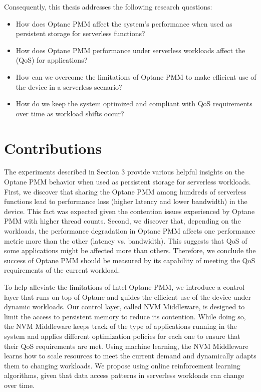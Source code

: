 Consequently, this thesis addresses the following research questions:

\begin{itemize}
    \item How does Optane PMM affect the system’s performance when used as persistent storage for serverless functions?
    \item How does Optane PMM performance under serverless workloads affect the (QoS) for applications?
    \item How can we overcome the limitations of Optane PMM to make efficient use of the device in a serverless scenario?
    \item How do we keep the system optimized and compliant with QoS requirements over time as workload shifts occur?
\end{itemize}

\section{Contributions}

The experiments described in Section 3 provide various helpful insights on the Optane PMM behavior when used as persistent storage for serverless workloads. First, we discover that sharing the Optane PMM among hundreds of serverless functions lead to performance loss (higher latency and lower bandwidth) in the device. This fact was expected given the contention issues experienced by Optane PMM with higher thread counts. Second, we discover that, depending on the workloads, the performance degradation in Optane PMM affects one performance metric more than the other (latency vs. bandwidth). This suggests that QoS of some applications might be affected more than others. Therefore, we conclude the success of Optane PMM should be measured by its capability of meeting the QoS requirements of the current workload.

To help alleviate the limitations of Intel Optane PMM, we introduce a control layer that runs on top of Optane and guides the efficient use of the device under dynamic workloads.  Our control layer, called NVM Middleware, is designed to limit the access to persistent memory to reduce its contention. While doing so, the NVM Middleware keeps track of the type of applications running in the system and applies different optimization policies for each one to ensure that their QoS requirements are met. Using machine learning, the NVM Middleware learns how to scale resources to meet the current demand and dynamically adapts them to changing workloads. We propose using online reinforcement learning algorithms, given that data access patterns in serverless workloads can change over time.

